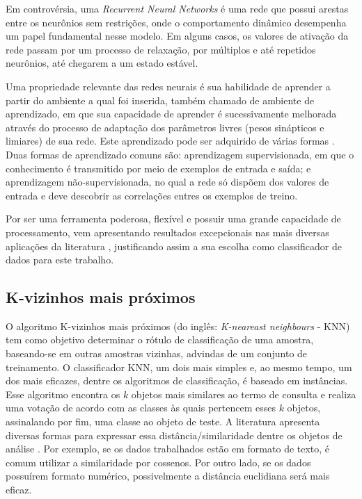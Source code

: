  Em controvérsia, uma \textit{Recurrent Neural Networks} é uma rede que possui arestas entre os neurônios sem restrições, onde o comportamento dinâmico desempenha um papel fundamental nesse modelo. Em alguns casos, os valores de ativação da rede passam por um processo de relaxação, por múltiplos e até repetidos neurônios, até chegarem a um estado estável.
 
 Uma propriedade relevante das redes neurais é sua habilidade de aprender a partir do ambiente a qual foi inserida, também chamado de ambiente de aprendizado, em que sua capacidade de aprender é sucessivamente melhorada através do processo de adaptação dos parâmetros livres (pesos sinápticos e limiares) de sua rede. Este aprendizado pode ser adquirido de várias formas \citep{bishop2006pattern, duda1973pattern, Rauber2005}. Duas formas de aprendizado comuns são: aprendizagem supervisionada, em que o conhecimento é transmitido por meio de exemplos de entrada e saída; e aprendizagem não-supervisionada, no qual a rede só dispõem dos valores de entrada e deve descobrir as correlações entres os exemplos de treino.
 
 Por ser uma ferramenta poderosa, flexível e possuir uma grande capacidade de processamento, vem apresentando resultados excepcionais nas mais diversas aplicações da literatura \citep{gupta2018text, martin2018speech, bishop2006pattern, duda1973pattern, Rauber2005}, justificando assim a sua escolha como classificador de dados para este trabalho.

\subsection{K-vizinhos mais próximos}
O algoritmo K-vizinhos mais próximos (do inglês: \textit{K-neareast neighbours} - KNN) tem como objetivo determinar o rótulo de classificação de uma amostra, baseando-se em outras amostras vizinhas, advindas de um conjunto de treinamento. O classificador KNN, um dois mais simples e, ao mesmo tempo, um dos mais eficazes, dentre os algoritmos de classificação, é baseado em instâncias. Esse algoritmo encontra os $k$ objetos mais similares ao termo de consulta e realiza uma votação de acordo com as classes às quais pertencem esses $k$ objetos, assinalando por fim, uma classe ao objeto de teste. A literatura apresenta diversas formas para expressar essa distância/similaridade dentre os objetos de análise \citep{fukunaga1975knn, duda1973pattern}. Por exemplo, se os dados trabalhados estão em formato de texto, é comum utilizar a similaridade por cossenos. Por outro lado, se os dados possuírem formato numérico, possivelmente a distância euclidiana será mais eficaz.


